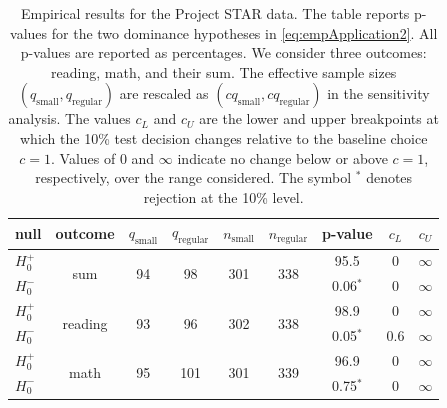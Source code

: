 \documentclass[11pt]{article}
\numberwithin{equation}{section}
\begin{document}
\begin{table}[h]\small 
    \centering
    \begin{tabular}{lcccccccc}
      \hline
      null 
      & outcome
      & $q_{\mathrm{small}}$ 
      & $q_{\mathrm{regular}}$ 
      & $n_{\mathrm{small}}$ 
      & $n_{\mathrm{regular}}$ 
      & p-value 
      & $c_L$ 
      & $c_U$\\
      \hline
       $H^{+}_0$  
       & \multirow{2}{*}{sum} 
       & \multirow{2}{*}{94} 
       & \multirow{2}{*}{98} 
       & \multirow{2}{*}{301} 
       & \multirow{2}{*}{338} 
       & 95.5 
       & 0 
       & $\infty$\\
       $H^{-}_0$ 
       &  
       &
       &  
       &  
       &  
       & 0.06$^{*}$ 
       & 0 
       & $\infty$\\
      \hline
      $H^{+}_0$  
       & \multirow{2}{*}{reading} 
       & \multirow{2}{*}{93} 
       & \multirow{2}{*}{96} 
       & \multirow{2}{*}{302} 
       & \multirow{2}{*}{338} 
       & 98.9
       & 0 
       & $\infty$\\
       $H^{-}_0$ 
       &  
       &
       &  
       &  
       &  
       & 0.05$^{*}$ 
       & 0.6 
       & $\infty$\\
      \hline
      $H^{+}_0$  
       & \multirow{2}{*}{math} 
       & \multirow{2}{*}{95} 
       & \multirow{2}{*}{101} 
       & \multirow{2}{*}{301} 
       & \multirow{2}{*}{339} 
       & 96.9 
       & 0 
       & $\infty$\\
       $H^{-}_0$ 
       &  
       &
       &  
       &  
       &  
       & 0.75$^{*}$ 
       & 0 
       & $\infty$\\
      \hline
    \end{tabular}
    \caption{\small Empirical results for the Project STAR data. The table reports p-values for the two dominance hypotheses in \eqref{eq:empApplication2}. All p-values are reported as percentages. We consider three outcomes: reading, math, and their sum. The effective sample sizes $(q_{\mathrm{small}},q_{\mathrm{regular}})$ are rescaled as $(cq_{\mathrm{small}},cq_{\mathrm{regular}})$ in the sensitivity analysis. The values $c_L$ and $c_U$ are the lower and upper breakpoints at which the 10\% test decision changes relative to the baseline choice $c=1$. Values of $0$ and $\infty$ indicate no change below or above $c=1$, respectively, over the range considered. The symbol $^{*}$ denotes rejection at the 10\% level.}
    \label{tab:qyStarFsdExact}
\end{table}
\end{document}
